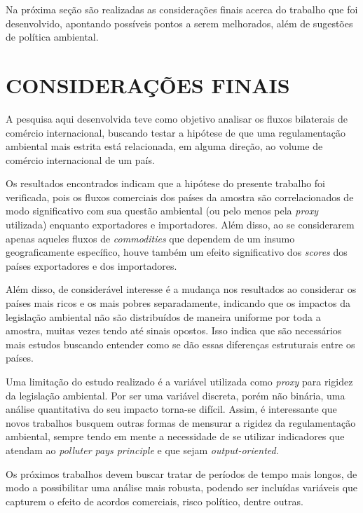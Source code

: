 \documentclass[12pt,
               openright,
               oneside,
               a4paper,
							 section=TITLE,     %
               subsection=Title,  %
               english,brazil]{article}
\begin{document}
\newpage

Na próxima seção são realizadas as considerações finais acerca do trabalho que foi desenvolvido, apontando possíveis pontos a serem melhorados, além de sugestões de política ambiental.

\section{CONSIDERAÇÕES FINAIS}

A pesquisa aqui desenvolvida teve como objetivo analisar os fluxos bilaterais de comércio internacional, buscando testar a hipótese de que uma regulamentação ambiental mais estrita está relacionada, em alguma direção, ao volume de comércio internacional de um país. 

Os resultados encontrados indicam que a hipótese do presente trabalho foi verificada, pois os fluxos comerciais dos países da amostra são correlacionados de modo significativo com sua questão ambiental (ou pelo menos pela \textit{proxy} utilizada) enquanto exportadores e importadores. Além disso, ao se considerarem apenas aqueles fluxos de \textit{commodities} que dependem de um insumo geograficamente específico, houve também um efeito significativo dos \textit{scores} dos países exportadores e dos importadores.

Além disso, de considerável interesse é a mudança nos resultados ao considerar os países mais ricos e os mais pobres separadamente, indicando que os impactos da legislação ambiental não são distribuídos de maneira uniforme por toda a amostra, muitas vezes tendo até sinais opostos. Isso indica que são necessários mais estudos buscando entender como se dão essas diferenças estruturais entre os países.


Uma limitação do estudo realizado é a variável utilizada como \textit{proxy} para rigidez da legislação ambiental. Por ser uma variável discreta, porém não binária, uma análise quantitativa do seu impacto torna-se difícil.  Assim, é interessante que novos trabalhos busquem outras formas de mensurar a rigidez da regulamentação ambiental, sempre tendo em mente a necessidade de se utilizar indicadores que atendam ao \textit{polluter pays principle} e que sejam \textit{output-oriented}.

Os próximos trabalhos devem buscar tratar de períodos de tempo mais longos, de modo a possibilitar uma análise mais robusta, podendo ser incluídas variáveis que capturem o efeito de acordos comerciais, risco político, dentre outras.
\end{document}
